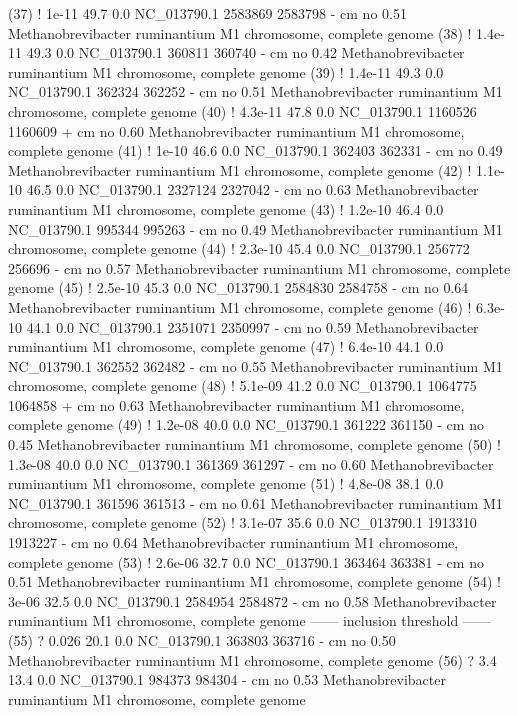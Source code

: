 \begin{sreoutput}
 (37) !     1e-11   49.7   0.0  NC_013790.1 2583869 2583798 -  cm    no 0.51  Methanobrevibacter ruminantium M1 chromosome, complete genome
 (38) !   1.4e-11   49.3   0.0  NC_013790.1  360811  360740 -  cm    no 0.42  Methanobrevibacter ruminantium M1 chromosome, complete genome
 (39) !   1.4e-11   49.3   0.0  NC_013790.1  362324  362252 -  cm    no 0.51  Methanobrevibacter ruminantium M1 chromosome, complete genome
 (40) !   4.3e-11   47.8   0.0  NC_013790.1 1160526 1160609 +  cm    no 0.60  Methanobrevibacter ruminantium M1 chromosome, complete genome
 (41) !     1e-10   46.6   0.0  NC_013790.1  362403  362331 -  cm    no 0.49  Methanobrevibacter ruminantium M1 chromosome, complete genome
 (42) !   1.1e-10   46.5   0.0  NC_013790.1 2327124 2327042 -  cm    no 0.63  Methanobrevibacter ruminantium M1 chromosome, complete genome
 (43) !   1.2e-10   46.4   0.0  NC_013790.1  995344  995263 -  cm    no 0.49  Methanobrevibacter ruminantium M1 chromosome, complete genome
 (44) !   2.3e-10   45.4   0.0  NC_013790.1  256772  256696 -  cm    no 0.57  Methanobrevibacter ruminantium M1 chromosome, complete genome
 (45) !   2.5e-10   45.3   0.0  NC_013790.1 2584830 2584758 -  cm    no 0.64  Methanobrevibacter ruminantium M1 chromosome, complete genome
 (46) !   6.3e-10   44.1   0.0  NC_013790.1 2351071 2350997 -  cm    no 0.59  Methanobrevibacter ruminantium M1 chromosome, complete genome
 (47) !   6.4e-10   44.1   0.0  NC_013790.1  362552  362482 -  cm    no 0.55  Methanobrevibacter ruminantium M1 chromosome, complete genome
 (48) !   5.1e-09   41.2   0.0  NC_013790.1 1064775 1064858 +  cm    no 0.63  Methanobrevibacter ruminantium M1 chromosome, complete genome
 (49) !   1.2e-08   40.0   0.0  NC_013790.1  361222  361150 -  cm    no 0.45  Methanobrevibacter ruminantium M1 chromosome, complete genome
 (50) !   1.3e-08   40.0   0.0  NC_013790.1  361369  361297 -  cm    no 0.60  Methanobrevibacter ruminantium M1 chromosome, complete genome
 (51) !   4.8e-08   38.1   0.0  NC_013790.1  361596  361513 -  cm    no 0.61  Methanobrevibacter ruminantium M1 chromosome, complete genome
 (52) !   3.1e-07   35.6   0.0  NC_013790.1 1913310 1913227 -  cm    no 0.64  Methanobrevibacter ruminantium M1 chromosome, complete genome
 (53) !   2.6e-06   32.7   0.0  NC_013790.1  363464  363381 -  cm    no 0.51  Methanobrevibacter ruminantium M1 chromosome, complete genome
 (54) !     3e-06   32.5   0.0  NC_013790.1 2584954 2584872 -  cm    no 0.58  Methanobrevibacter ruminantium M1 chromosome, complete genome
 ------ inclusion threshold ------
 (55) ?     0.026   20.1   0.0  NC_013790.1  363803  363716 -  cm    no 0.50  Methanobrevibacter ruminantium M1 chromosome, complete genome
 (56) ?       3.4   13.4   0.0  NC_013790.1  984373  984304 -  cm    no 0.53  Methanobrevibacter ruminantium M1 chromosome, complete genome
\end{sreoutput}

